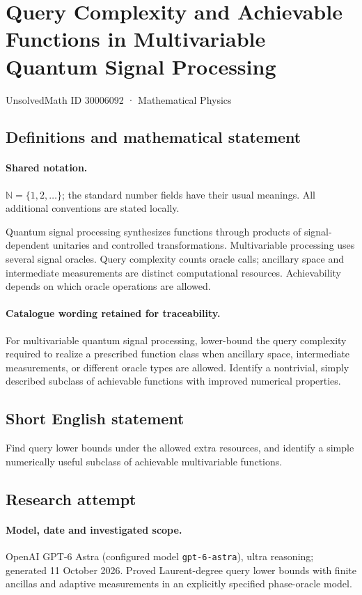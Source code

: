 \documentclass[11pt]{article}
\begin{document}
\setcounter{section}{30006091}
\section{Query Complexity and Achievable Functions in Multivariable Quantum Signal Processing}\label{30006092}
{\small UnsolvedMath ID 30006092 · Mathematical Physics}
\subsection{Definitions and mathematical statement}

\paragraph{Shared notation.}$\mathbb N=\{1,2,\ldots\}$; the standard number fields have their usual meanings. All additional conventions are stated locally.


Quantum signal processing synthesizes functions through products of signal-dependent unitaries and controlled transformations. Multivariable processing uses several signal oracles. Query complexity counts oracle calls; ancillary space and intermediate measurements are distinct computational resources. Achievability depends on which oracle operations are allowed.

\paragraph{Catalogue wording retained for traceability.}
For multivariable quantum signal processing, lower-bound the query complexity required to realize a prescribed function class when ancillary space, intermediate measurements, or different oracle types are allowed. Identify a nontrivial, simply described subclass of achievable functions with improved numerical properties.
\subsection{Short English statement}
Find query lower bounds under the allowed extra resources, and identify a simple numerically useful subclass of achievable multivariable functions.
\subsection{Research attempt}
\paragraph{Model, date and investigated scope.}
OpenAI GPT-6 Astra (configured model \texttt{gpt-6-astra}), ultra reasoning; generated 11 October 2026. Proved Laurent-degree query lower bounds with finite ancillas and adaptive measurements in an explicitly specified phase-oracle model.
\end{document}

